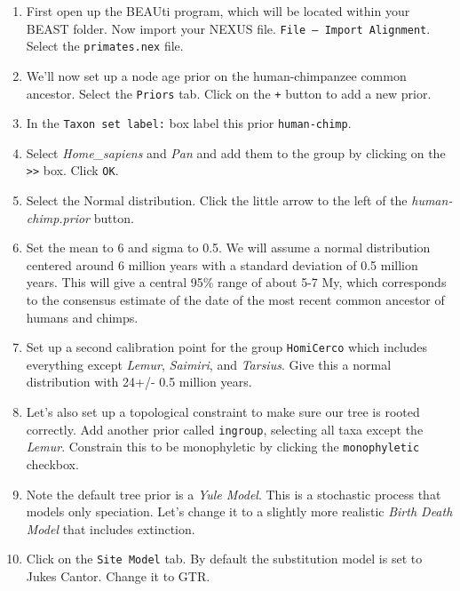 \documentclass[11pt]{article}
\begin{document}
\begin{enumerate}

\item First open up the BEAUti program, which will be located within your BEAST folder. 
Now import your NEXUS file. \texttt{File -- Import Alignment}. 
Select the \texttt{primates.nex} file. 

\item We'll now set up a node age prior on the human-chimpanzee common ancestor. 
Select the \texttt{Priors} tab. 
Click on the \texttt{+} button to add a new prior.

\item In the \texttt{Taxon set label:} box label this prior \texttt{human-chimp}.

\item Select \textit{Home\_sapiens} and \textit{Pan} and add them to the group
by clicking on the \texttt{>>} box. Click \texttt{OK}.

\item Select the Normal distribution. Click the little arrow to the left of
the \textit{human-chimp.prior} button.

\item Set the mean to 6 and sigma to 0.5. We will assume a normal distribution centered around 6 million years with a standard deviation of 0.5 million years. This will give a central 95\% range of about 5-7 My, which corresponds to the consensus estimate of the date of the most recent common ancestor of humans and chimps.

\item Set up a second calibration point for the group \texttt{HomiCerco}
which includes everything except \textit{Lemur}, \textit{Saimiri}, and \textit{Tarsius}.
Give this a normal distribution with 24+/- 0.5 million years.

\item Let's also set up a topological constraint to make sure our tree is rooted
correctly. Add another prior called \texttt{ingroup}, selecting all taxa except
the \textit{Lemur}. Constrain this to be monophyletic by clicking the \texttt{monophyletic}
checkbox.

\item Note the default tree prior is a \textit{Yule Model}. This is 
a stochastic process that models only speciation. Let's change it to
a slightly more realistic \textit{Birth Death Model} that includes extinction.

\item Click on the \texttt{Site Model} tab. By default the substitution model is 
set to Jukes Cantor. Change it to GTR.


\end{enumerate}
\end{document}
